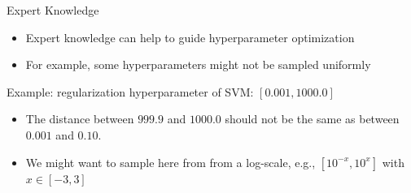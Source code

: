 \begin{frame}{Expert Knowledge}

\begin{itemize}
	\item Expert knowledge can help to guide hyperparameter optimization
	\item For example, some hyperparameters might not be sampled uniformly
\end{itemize}


Example: regularization hyperparameter of SVM: $[0.001, 1000.0]$

\begin{itemize}
	\item The distance between $999.9$ and $1000.0$ should not be the same as between $0.001$ and $0.10$.
    \item We might want to sample here from from a log-scale, e.g., $[10^{-x}, 10^{x}]$ with $x \in [-3, 3]$
\end{itemize}



\end{frame}
